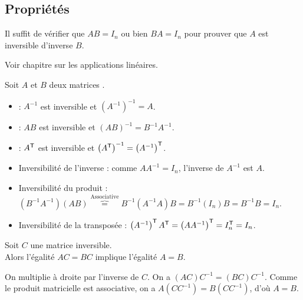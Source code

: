 \documentclass{book}
\begin{document}
\subsection{Propriétés}
\begin{Proposition}
Il suffit de vérifier que $AB=I_{n}$ ou bien $BA=I_n$ pour prouver que $A$ est inversible d'inverse $B$.  
\end{Proposition}
\begin{Demonstration}
Voir chapitre sur les applications linéaires. 
\end{Demonstration}
\begin{Proposition}
Soit $A$ et $B$ deux matrices .\\
\begin{itemize}
\item {} : $A^{-1}$ est inversible et $\left(A^{-1}\right)^{-1}=A$.
\item {} : $AB$ est inversible et $\left(AB\right)^{-1}=B^{-1} A^{-1}$. 
\item {} : $A^{\mathsf {T}}$ est inversible et $\left(A^{\mathsf {T}}\right)^{-1}=\left(A^{-1}\right)^{\mathsf {T}}$. 
\end{itemize} 
\end{Proposition}
\begin{Demonstration}
\begin{itemize}
\item Inversibilité de l'inverse : comme  $A A^{-1}=I_n$, l'inverse de $A^{-1}$ est $A$.
\item Inversibilité du produit : $\left(B^{-1} A^{-1}\right)\left(AB\right)\overbrace{=}^{\text{Associative}}B^{-1}(A^{-1}A)B=B^{-1}(I_n)B=B^{-1}B=I_n. $
\item Inversibilité de la transposée : $\left(A^{-1}\right)^{\mathsf {T}}A^{\mathsf {T}}=\left(AA^{-1}\right)^{\mathsf {T}}=I_n^{\mathsf {T}}=I_n $. 
\end{itemize} 
\end{Demonstration}

\begin{Proposition}
Soit $C$ une matrice inversible.\\
Alors l'égalité $AC = BC$ implique l'égalité $A = B.$
\end{Proposition}
\begin{Demonstration}
On multiplie à droite par l'inverse de $C$. On a 
 $(AC)C^{-1} = (BC)C^{-1}$. Comme le produit matricielle est associative, on a  $A(CC^{-1}) = B(CC^{-1})$, d'où $A=B$.
\end{Demonstration}
\end{document}
